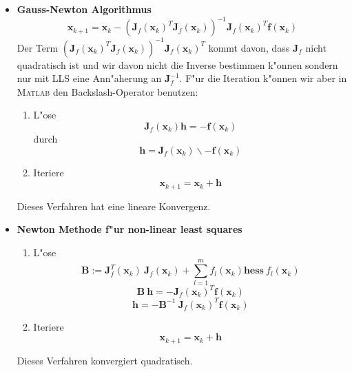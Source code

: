 \documentclass[german, 10pt, a4paper, twocolumn]{scrartcl}
\begin{document}
\begin{itemize}
	\item \textbf{Gauss-Newton Algorithmus}\\
		\begin{displaymath}
			\mathbf{x}_{k+1} = \mathbf{x}_k - (\mathbf{J}_f(\mathbf{x}_k)^T\mathbf{J}_f(\mathbf{x}_k))^{-1}\mathbf{J}_f(\mathbf{x}_k)^T\mathbf{f}(\mathbf{x}_k)
		\end{displaymath}
		Der Term $(\mathbf{J}_f(\mathbf{x}_k)^T\mathbf{J}_f(\mathbf{x}_k))^{-1}\mathbf{J}_f(\mathbf{x}_k)^T$ kommt davon, dass $\mathbf{J}_f$ nicht quadratisch ist und wir davon nicht die Inverse bestimmen k"onnen sondern nur mit LLS eine Ann"aherung an $\mathbf{J}_f^{-1}$. F"ur die Iteration k"onnen wir aber in \textsc{Matlab} den Backslash-Operator benutzen:
		\begin{enumerate}
			\item L"ose
				\begin{displaymath}
					\mathbf{J}_f(\mathbf{x}_k)\mathbf{h} = - \mathbf{f}(\mathbf{x}_k)
				\end{displaymath}
				durch
				\begin{displaymath}
					\mathbf{h} = \mathbf{J}_f(\mathbf{x}_k) \backslash -\mathbf{f}(\mathbf{x}_k)
				\end{displaymath}
			\item Iteriere
				\begin{displaymath}
					\mathbf{x}_{k+1} = \mathbf{x}_k + \mathbf{h}
				\end{displaymath}
		\end{enumerate}
		Dieses Verfahren hat eine lineare Konvergenz.
	
	\item \textbf{Newton Methode f"ur non-linear least squares}
		\begin{enumerate}
			\item L"ose
				\begin{displaymath}
					\mathbf{B} := \mathbf{J}_f^T(\mathbf{x}_k)\:\mathbf{J}_f(\mathbf{x}_k)+\sum^m_{l=1} f_l(\mathbf{x}_k)\mathbf{hess}\:f_l(\mathbf{x}_k)
				\end{displaymath}
				\begin{displaymath}
					\mathbf{B}\:\mathbf{h} = -\mathbf{J}_f(\mathbf{x}_k)^T\mathbf{f}(\mathbf{x}_k)
				\end{displaymath}
				\begin{displaymath}
					\mathbf{h} = -\mathbf{B}^{-1}\:\mathbf{J}_f(\mathbf{x}_k)^T\mathbf{f}(\mathbf{x}_k)
				\end{displaymath}
			\item Iteriere
				\begin{displaymath}
					\mathbf{x}_{k+1}=\mathbf{x}_k+\mathbf{h}
				\end{displaymath}
		\end{enumerate}
		Dieses Verfahren konvergiert quadratisch.


\end{itemize}
\end{document}
